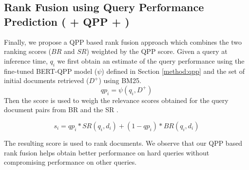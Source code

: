 \subsection{Rank Fusion using Query Performance Prediction (\car{} + QPP + \rf{})}
\label{method:qpp_rf}
Finally, we propose a QPP based rank fusion approach which combines the two ranking scores ($BR$ and $SR$) weighted by the QPP score.
Given a query at inference time, $q_i$ we first obtain an estimate of the query performance using the fine-tuned BERT-QPP model ($\psi$) defined in Section \ref{method:qpp} and the set of initial documents retrieved ($D^+$) using BM25.
\[qp_i = \psi\left(q_i,D^+\right)\]
Then the score is used to weigh the relevance scores obtained for the query document pairs from BR  and the SR .

\begin{equation}
    s_i = qp_i * SR(q_i,d_i) + (1-qp_i) * BR(q_i,d_i)
\label{eq:qpp_rf}
\end{equation}


The resulting score is used to rank documents. We observe that our QPP based rank fusion helps obtain better performance on hard queries without compromising performance on other queries.
